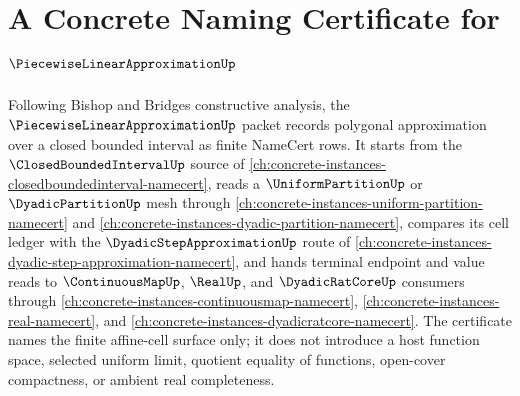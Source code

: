 \chapter{A Concrete Naming Certificate for $\PiecewiseLinearApproximationUp$}
\label{ch:concrete-instances-piecewise-linear-approximation-namecert}

Following Bishop and Bridges constructive analysis, the $\PiecewiseLinearApproximationUp$ packet records polygonal approximation over a closed bounded interval as finite NameCert rows. It starts from the $\ClosedBoundedIntervalUp$ source of \autoref{ch:concrete-instances-closedboundedinterval-namecert}, reads a $\UniformPartitionUp$ or $\DyadicPartitionUp$ mesh through \autoref{ch:concrete-instances-uniform-partition-namecert} and \autoref{ch:concrete-instances-dyadic-partition-namecert}, compares its cell ledger with the $\DyadicStepApproximationUp$ route of \autoref{ch:concrete-instances-dyadic-step-approximation-namecert}, and hands terminal endpoint and value reads to $\ContinuousMapUp$, $\RealUp$, and $\DyadicRatCoreUp$ consumers through \autoref{ch:concrete-instances-continuousmap-namecert}, \autoref{ch:concrete-instances-real-namecert}, and \autoref{ch:concrete-instances-dyadicratcore-namecert}. The certificate names the finite affine-cell surface only; it does not introduce a host function space, selected uniform limit, quotient equality of functions, open-cover compactness, or ambient real completeness.

